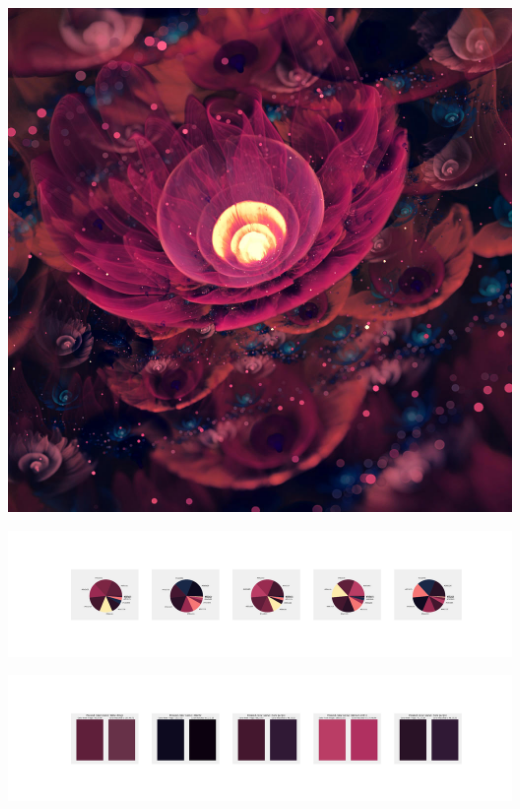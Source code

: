 \documentclass[11pt]{article}
\begin{document}
\begin{landscape}
    \begin{center}
    \includegraphics[width=\textwidth]{./nbimg/file (430).jpg}
    \end{center}

    \begin{center}
    \includegraphics[width=250mm]{./nbimg/pie-368.jpg}
    \end{center}

    \begin{center}
    \includegraphics[width=250mm]{./nbimg/peak-368.jpg}
    \end{center}
    


\end{landscape}
\end{document}
